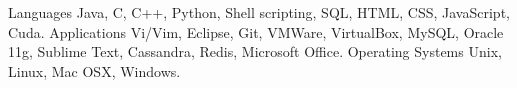 \begin{cventries}
  \cventry
    {Languages}
    {}
    {}
    {}
    {Java, C, C++, Python, Shell scripting, SQL, HTML, CSS, JavaScript, Cuda.}
  \cventry
    {Applications}
    {}
    {}
    {}
    {Vi/Vim, Eclipse, Git, VMWare, VirtualBox, 
MySQL, Oracle 11g, Sublime Text, Cassandra, Redis, Microsoft Office.}
\cventry
    {Operating Systems}
    {}
    {}
    {}
    {Unix, Linux, Mac OSX, Windows.}
\end{cventries}

